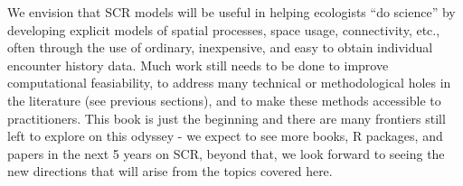 We envision that SCR models will be useful in helping
ecologists ``do science'' by developing explicit models of spatial
processes, space usage, connectivity, etc., often through the use of ordinary,
inexpensive, and
easy to obtain individual encounter history data. Much work still needs to
be done to improve computational feasiability, to address many
technical or methodological holes in the literature (see previous
sections), and to make these methods accessible to practitioners.
This book is just the beginning and there are many frontiers still
left to explore on this odyssey - we expect to see more books, R packages,
and papers in the next 5 years on SCR, beyond that, we look forward to seeing
the new directions that will arise from the topics covered here.

















